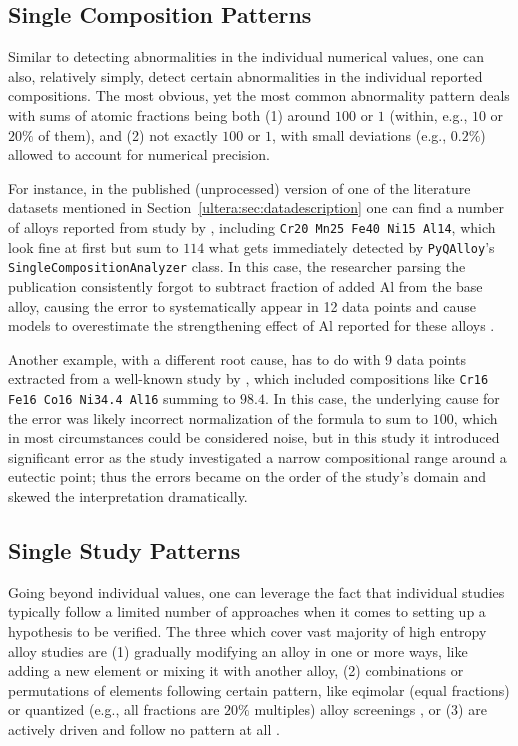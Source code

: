\subsection{Single Composition Patterns} \label{pyqalloy:ssec:singlecomp}

Similar to detecting abnormalities in the individual numerical values, one can also, relatively simply, detect certain abnormalities in the individual reported compositions. The most obvious, yet the most common abnormality pattern deals with sums of atomic fractions being both (1) around $100$ or $1$ (within, e.g., $10$ or $20\%$ of them), and (2) not exactly $100$ or $1$, with small deviations (e.g., $0.2\%$) allowed to account for numerical precision.

For instance, in the published (unprocessed) version of one of the literature datasets mentioned in Section~\ref{ultera:sec:datadescription} one can find a number of alloys reported from study by \citet{Stepanov2019EffectContent}, including \texttt{Cr20 Mn25 Fe40 Ni15 Al14}, which look fine at first but sum to $114$ what gets immediately detected by \texttt{PyQAlloy}'s \texttt{SingleCompositionAnalyzer} class. In this case, the researcher parsing the publication consistently forgot to subtract fraction of added Al from the base alloy, causing the error to systematically appear in 12 data points and cause models to overestimate the strengthening effect of Al reported for these alloys \cite{Stepanov2019EffectContent}.

Another example, with a different root cause, has to do with 9 data points extracted from a well-known study by \cite{Lu2017DirectlyRange}, which included compositions like \texttt{Cr16 Fe16 Co16 Ni34.4 Al16} summing to $98.4$. In this case, the underlying cause for the error was likely incorrect normalization of the formula to sum to $100$, which in most circumstances could be considered noise, but in this study it introduced significant error as the study investigated a narrow compositional range around a eutectic point; thus the errors became on the order of the study's domain and skewed the interpretation dramatically.


\subsection{Single Study Patterns}   \label{pyqalloy:ssec:singlestudy}

Going beyond individual values, one can leverage the fact that individual studies typically follow a limited number of approaches when it comes to setting up a hypothesis to be verified. The three which cover vast majority of high entropy alloy studies are (1) gradually modifying an alloy in one or more ways, like adding a new element or mixing it with another alloy, (2) combinations or permutations of elements following certain pattern, like eqimolar (equal fractions) or quantized (e.g., all fractions are $20\%$ multiples) alloy screenings \cite{Elder2023ComputationalDown-selection, Elder2023ComputationalValidation}, or (3) are actively driven and follow no pattern at all \cite{Rao2022MachineDiscovery}. 

